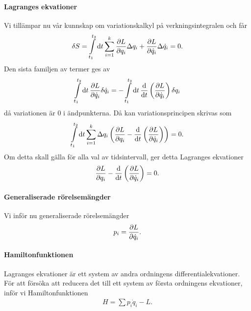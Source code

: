 \paragraph{Lagranges ekvationer}
Vi tillämpar nu vår kunnskap om variationskalkyl på verkningsintegralen och får
\begin{align*}
	\delta S = \int\limits_{t_{1}}^{t_{2}}\dd{t}\sum\limits_{i = 1}^{k}\pdv{L}{q_{i}}\Delta q_{i} + \pdv{L}{\dot{q}_{i}}\Delta \dot{q}_{i} = 0.
\end{align*}
Den sista familjen av termer ges av
\begin{align*}
	\int\limits_{t_{1}}^{t_{2}}\dd{t}\pdv{L}{\dot{q}_{i}}\delta \dot{q}_{i} = -\int\limits_{t_{1}}^{t_{2}}\dd{t}\dv{t}\left(\pdv{L}{\dot{q}_{i}}\right)\delta q_{i}
\end{align*}
då variationen är $0$ i ändpunkterna. Då kan variationsprincipen skrivas som
\begin{align*}
	\int\limits_{t_{1}}^{t_{2}}\dd{t}\sum\limits_{i = 1}^{k}\Delta q_{i}\left(\pdv{L}{q_{i}} - \dv{t}\left(\pdv{L}{\dot{q}_{i}}\right)\right) = 0.
\end{align*}
Om detta skall gälla för alla val av tidsintervall, ger detta Lagranges ekvationer
\begin{align*}
	\pdv{L}{q_{i}} - \dv{t}\left(\pdv{L}{\dot{q}_{i}}\right) = 0.
\end{align*}

\paragraph{Generaliserade rörelsemängder}
Vi inför nu generaliserade rörelsemängder
\begin{align*}
	p_{i} = \pdv{L}{\dot{q}_{i}}.
\end{align*}

\paragraph{Hamiltonfunktionen}
Lagranges ekvationer är ett system av andra ordningens differentialekvationer. För att försöka att reducera det till ett system av första ordningens ekvationer, inför vi Hamiltonfunktionen
\begin{align*}
	H = \sum p_{i}\dot{q}_{i} - L.
\end{align*}

